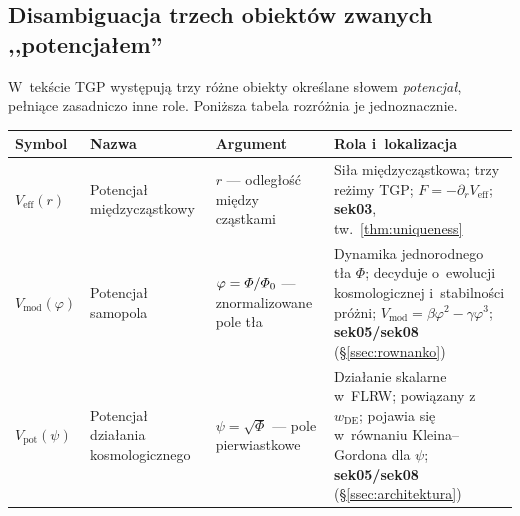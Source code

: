 \subsection*{Disambiguacja trzech obiekt\'ow zwanych ,,potencja\l{}em''}
\label{app:A-potential-disambiguation}

W~tek\'scie TGP wyst\k{e}puj\k{a} trzy r\'o\.zne obiekty okre\'slane
s\l{}owem \emph{potencja\l{}}, pe\l{}ni\k{a}ce zasadniczo inne role.
Poni\.zsza tabela rozr\'o\.znia je jednoznacznie.

\begin{center}
\small
\begin{tabular}{@{}p{2.6cm}p{2.6cm}p{3.0cm}p{4.8cm}@{}}
\toprule
\textbf{Symbol} & \textbf{Nazwa} & \textbf{Argument} & \textbf{Rola i~lokalizacja} \\
\midrule
$V_{\mathrm{eff}}(r)$
  & Potencja\l{} mi\k{e}dzycz\k{a}stkowy
  & $r$ --- odleg\l{}o\'s\'c mi\k{e}dzy cz\k{a}stkami
  & Si\l{}a mi\k{e}dzycz\k{a}stkowa; trzy re\.zimy TGP;
    $F = -\partial_r V_{\mathrm{eff}}$;
    \textbf{sek03}, tw.~\ref{thm:uniqueness} \\
\midrule
$V_{\mathrm{mod}}(\varphi)$
  & Potencja\l{} samopola
  & $\varphi = \varPhi/\varPhi_0$ --- znormalizowane pole t\l{}a
  & Dynamika jednorodnego t\l{}a $\Phi$; decyduje o~ewolucji
    kosmologicznej i~stabilno\'sci pr\'o\.zni;
    $V_{\mathrm{mod}} = \beta\varphi^2 - \gamma\varphi^3$;
    \textbf{sek05/sek08} (\S\ref{ssec:rownanko}) \\
\midrule
$V_{\mathrm{pot}}(\psi)$
  & Potencja\l{} dzia\l{}ania kosmologicznego
  & $\psi = \sqrt{\Phi}$ --- pole pierwiastkowe
  & Dzia\l{}anie skalarne w~FLRW; powi\k{a}zany z~$w_{\mathrm{DE}}$;
    pojawia si\k{e} w~r\'ownaniu Kleina--Gordona dla $\psi$;
    \textbf{sek05/sek08} (\S\ref{ssec:architektura}) \\
\bottomrule
\end{tabular}
\end{center}

